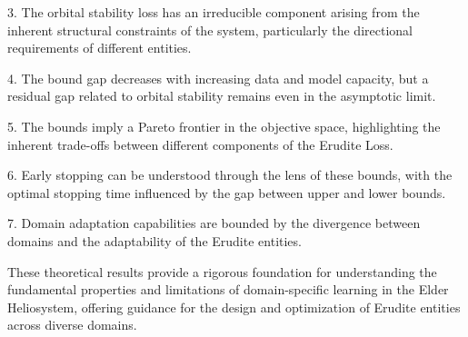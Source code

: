 3. The orbital stability loss has an irreducible component arising from the inherent structural constraints of the system, particularly the directional requirements of different entities.

4. The bound gap decreases with increasing data and model capacity, but a residual gap related to orbital stability remains even in the asymptotic limit.

5. The bounds imply a Pareto frontier in the objective space, highlighting the inherent trade-offs between different components of the Erudite Loss.

6. Early stopping can be understood through the lens of these bounds, with the optimal stopping time influenced by the gap between upper and lower bounds.

7. Domain adaptation capabilities are bounded by the divergence between domains and the adaptability of the Erudite entities.

These theoretical results provide a rigorous foundation for understanding the fundamental properties and limitations of domain-specific learning in the Elder Heliosystem, offering guidance for the design and optimization of Erudite entities across diverse domains.